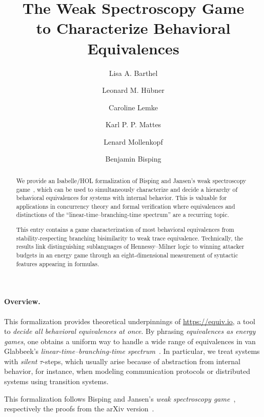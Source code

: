 \documentclass[10pt,a4paper]{article}
\title{The \textbf{Weak Spectroscopy Game} \\ to Characterize Behavioral Equivalences}
\author[1]{Lisa A. Barthel}
\author[1]{Leonard M. Hübner}
\author[1,2]{Caroline Lemke}
\author[1]{Karl P. P. Mattes}
\author[1]{Lenard Mollenkopf}
\author[1,3]{Benjamin Bisping}
\affil[1]{Technische Universität Berlin, Germany}
\affil[2]{Carl von Ossietzky Universität Oldenburg, Germany}
\affil[3]{Télécom SudParis, Institut Polytechnique de Paris, France}
\begin{document}
\maketitle

\begin{abstract}
  \noindent
  We provide an Isabelle/HOL formalization of Bisping and Jansen's weak spectroscopy game~\cite{bj2024silentStepSpectroscopyExpress},
  which can be used to simultaneously characterize and decide a hierarchy of behavioral equivalences for systems with internal behavior.
  This is valuable for applications in concurrency theory and formal verification where equivalences and distinctions of the ``linear-time--branching-time spectrum'' are a recurring topic.

  This entry contains a game characterization of most behavioral equivalences from stability-respecting branching bisimilarity to weak trace equivalence.
  Technically, the results link distinguishing sublanguages of Hennessy--Milner logic to winning attacker budgets in an energy game through an eight-dimensional measurement of syntactic features appearing in formulas.
\end{abstract}

\paragraph{Overview.}
This formalization provides theoretical underpinnings of \url{https://equiv.io}, a tool to \emph{decide all behavioral equivalences at once}.
By phrasing \emph{equivalences as energy games}, one obtains a uniform way to handle a wide range of equivalences in van Glabbeek's \emph{linear-time--branching-time spectrum}~\cite{glabbeek1990ltbt1,glabbeek1993ltbt2}.
In particular, we treat systems with \emph{silent} $\tau$-steps, which usually arise because of abstraction from internal behavior, for instance, when modeling communication protocols or distributed systems using transition systems.

This formalization follows Bisping and Jansen's \emph{weak spectroscopy game}~\cite{bj2024silentStepSpectroscopyExpress}, respectively the proofs from the arXiv version~\cite{bj2023silentStepSpectroscopyArxiv}.
\end{document}
